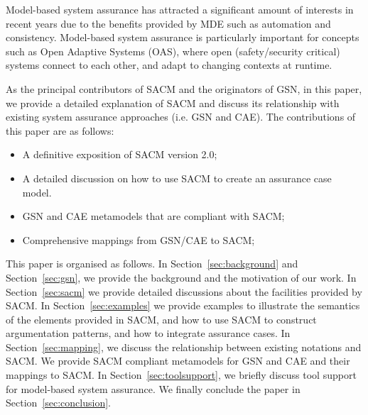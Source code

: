 Model-based system assurance has attracted a significant amount of interests in recent years due to the benefits provided by MDE such as automation and consistency. 
Model-based system assurance is particularly important for concepts such as Open Adaptive Systems (OAS), where open (safety/security critical) systems connect to each other, and adapt to changing contexts at runtime. 

As the principal contributors of SACM and the originators of GSN, in this paper, we provide a detailed explanation of SACM and discuss its relationship with existing system assurance approaches (i.e. GSN and CAE). 
The contributions of this paper are as follows:
\begin{itemize}
	\item A definitive exposition of SACM version 2.0;
	\item A detailed discussion on how to use SACM to create an assurance case model.
	\item GSN and CAE metamodels that are compliant with SACM;
	\item Comprehensive mappings from GSN/CAE to SACM;
\end{itemize}

This paper is organised as follows. 
In Section~\ref{sec:background} and Section~\ref{sec:gsn}, we provide the background and the motivation of our work. 
In Section~\ref{sec:sacm} we provide detailed discussions about the facilities provided by SACM.
In Section~\ref{sec:examples} we provide examples to illustrate the semantics of the elements provided in SACM, and how to use SACM to construct argumentation patterns, and how to integrate assurance cases.
In Section~\ref{sec:mapping}, we discuss the relationship between existing notations and SACM. 
We provide SACM compliant metamodels for GSN and CAE and their mappings to SACM. 
In Section~\ref{sec:toolsupport}, we briefly discuss tool support for model-based system assurance. 
We finally conclude the paper in Section~\ref{sec:conclusion}.


